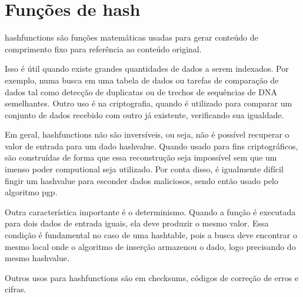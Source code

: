 
\section{Funções de hash}
\label{sec:sha1}

\begin{comment}
Aqui vou explicar como funciona o algoritmo da \gls{hashfunction} SHA-1 e mostrar como
e para que é usado na identificação de torrents e na verificação de integridade de
partes.
\end{comment}

\Glspl{hashfunction} são funções matemáticas usadas para gerar conteúdo de comprimento
fixo para referência ao conteúdo original.

Isso é útil quando existe grandes quantidades de dados a serem indexados. Por exemplo,
numa busca em uma tabela de dados ou tarefas de comparação de dados tal como detecção de
duplicatas ou de trechos de sequências de DNA semelhantes. Outro uso é na criptografia,
quando é utilizado para comparar um conjunto de dados recebido com outro já existente,
verificando sua igualdade.

Em geral, \glspl*{hashfunction} não são inversíveis, ou seja, não é possível recuperar o
valor de entrada para um dado \gls{hashvalue}. Quando usado para fins criptográficos,
são construídas de forma que essa reconstrução seja impossível sem que um imenso poder
computional seja utilizado. Por conta disso, é igualmente difícil fingir um
\gls*{hashvalue} para esconder dados maliciosos, sendo então usado pelo algoritmo
\gls{pgp}.

Outra característica importante é o determinismo. Quando a função é executada para dois
dados de entrada iguais, ela deve produzir o mesmo valor. Essa condição é fundamental
no caso de uma \gls*{hashtable}, pois a busca deve encontrar o mesmo local onde o
algoritmo de inserção armazenou o dado, logo precisando do mesmo \gls*{hashvalue}.

Outros usos para \glspl*{hashfunction} são em \glspl{checksum}, códigos de correção de
erros e cifras.

